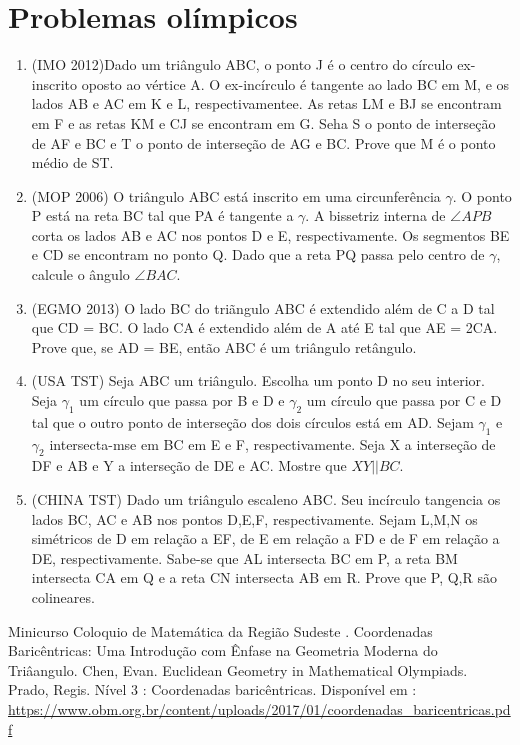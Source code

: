 \documentclass{article}
\begin{document}
\section{Problemas olímpicos}
\begin{enumerate}
    \item (IMO 2012)Dado um triângulo ABC, o ponto J é o centro do círculo ex-inscrito oposto ao vértice A. O ex-incírculo é tangente ao lado BC em M, e os lados AB e AC em K e L, respectivamentee. As retas LM  e BJ se encontram em F e as retas KM e CJ
    se encontram em G. Seha S o ponto de interseção de AF e BC e T o ponto de interseção de AG e BC. Prove que M é o ponto médio de ST.
    \item(MOP 2006) O triângulo ABC está inscrito em uma circunferência $\gamma$. O ponto P está na reta
    BC tal que PA é tangente a $\gamma$. A bissetriz interna de $\angle APB$ corta os lados AB e AC nos pontos
    D e E, respectivamente. Os segmentos BE e CD se encontram no ponto Q. Dado que a reta PQ
    passa pelo centro de $\gamma$, calcule o ângulo $\angle BAC$.
    \item(EGMO 2013) O lado BC do triãngulo ABC é extendido além de C a D tal que CD = BC. O lado CA é extendido além de A até E tal que AE = 2CA. Prove que, se AD = BE, então ABC é um triângulo retângulo.
    \item (USA TST) Seja ABC um triângulo. Escolha um ponto D no seu interior. Seja $\gamma_1$ um círculo que passa por B e D e $\gamma_2$ um círculo que passa por C e D tal que o outro ponto de interseção dos dois círculos está em AD. Sejam $\gamma_1$ e $\gamma_2$ intersecta-mse em BC em E e F, respectivamente. Seja X a interseção de DF e AB e Y a interseção de DE e AC. Mostre que $XY || BC$.
    \item (CHINA TST) Dado um triângulo escaleno ABC. Seu incírculo tangencia os lados BC, AC  e AB nos pontos D,E,F, respectivamente. Sejam L,M,N os simétricos de D em relação a EF, de E em relação a FD e de F em relação a DE, respectivamente. Sabe-se que AL intersecta BC em P, a reta BM intersecta CA em Q e a reta CN intersecta AB em R. Prove que P, Q,R são colineares.

    
\end{enumerate}




\begin{thebibliography}{9}
Minicurso
Coloquio de Matemática da Região Sudeste . Coordenadas Baricêntricas:
Uma Introdução com Ênfase na Geometria Moderna do Triâangulo.
Chen, Evan. Euclidean Geometry in Mathematical Olympiads.
Prado, Regis. Nível 3 : Coordenadas baricêntricas. Disponível em : 
\href{https://www.obm.org.br/content/uploads/2017/01/coordenadas_baricentricas.pdf}{https://www.obm.org.br/content/uploads/2017/01/coordenadas_baricentricas.pdf}
\end{thebibliography}
\end{document}
